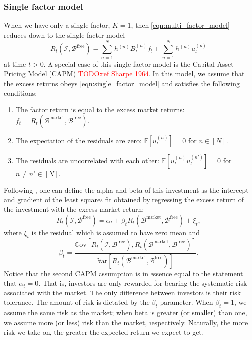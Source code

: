 \documentclass[12pt]{article}
\begin{document}
\subsubsection{Single factor model}
When we have only a single factor, $K=1$, then \eqref{eqn:multi_factor_model} reduces down to the single factor model
\begin{equation}
	R_t(\mathcal{I}, \mathcal{B}^{\text{free}}) = \sum_{n=1}^N h^{(n)} B_t^{(n)} f_t + \sum_{n=1}^N h^{(n)} u^{(n)}_t
	\label{eqn:single_factor_model}
\end{equation}
at time $t>0$. A special case of this single factor model is the Capital Asset Pricing Model (CAPM) \textcolor{red}{TODO:ref Sharpe 1964}. In this model, we assume that the excess returns obeys \eqref{eqn:single_factor_model} and satisfies the following conditions:
\begin{enumerate}
	\item The factor return is equal to the excess market returns: $f_t = R_t(\mathcal{B}^{\text{market}}, \mathcal{B}^{\text{free}})$.
	\item The expectation of the residuals are zero: $\mathbb{E}[u^{(n)}_t] = 0$ for $n \in [N]$.
	\item The residuals are uncorrelated with each other: $\mathbb{E}[u^{(n)}_t u^{(n')}_t] = 0$ for $n \neq n' \in [N]$.
\end{enumerate}
Following \citet[Chapter 1]{grinold1999}, one can define the alpha and beta of this investment as the intercept and gradient of the least squares fit obtained by regressing the excess return of the investment with the excess market return:
\begin{equation}
	R_t(\mathcal{I}, \mathcal{B}^{\text{free}})
	= \alpha_t + \beta_t R_t(\mathcal{B}^{\text{market}}, \mathcal{B}^{\text{free}}) + \xi_t,
\end{equation}
where $\xi_t$ is the residual which is assumed to have zero mean and 
\begin{equation}
	\beta_t = \frac{\mathbb{C}\text{ov}[R_t(\mathcal{I}, \mathcal{B}^{\text{free}}), R_t(\mathcal{B}^{\text{market}}, \mathcal{B}^{\text{free}})]}{ \mathbb{V}\text{ar}[R_t(\mathcal{B}^{\text{market}}, \mathcal{B}^{\text{free}})]}.
\end{equation} 
Notice that the second CAPM assumption is in essence equal to the statement that $\alpha_t = 0$. That is, investors are only rewarded for bearing the systematic risk associated with the market. The only difference between investors is their risk tolerance. The amount of risk is dictated by the $\beta_t$ parameter. When $\beta_t=1$, we assume the same risk as the market; when beta is greater (or smaller) than one, we assume more (or less) risk than the market, respectively. Naturally, the more risk we take on, the greater the expected return we expect to get. 
\end{document}

